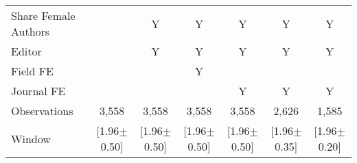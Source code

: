 \begin{tabular}{l*{6}{c}}
Share Female Authors &         &        Y&        Y&        Y&        Y&        Y\\
Editor          &         &        Y&        Y&        Y&        Y&        Y\\
Field FE        &         &         &        Y&         &         &         \\
Journal FE      &         &         &         &        Y&        Y&        Y\\
\hline
Observations    &    3,558&    3,558&    3,558&    3,558&    2,626&    1,585\\
Window          &[1.96$\pm$0.50]&[1.96$\pm$0.50]&[1.96$\pm$0.50]&[1.96$\pm$0.50]&[1.96$\pm$0.35]&[1.96$\pm$0.20]\\
\hline\hline
\end{tabular}
